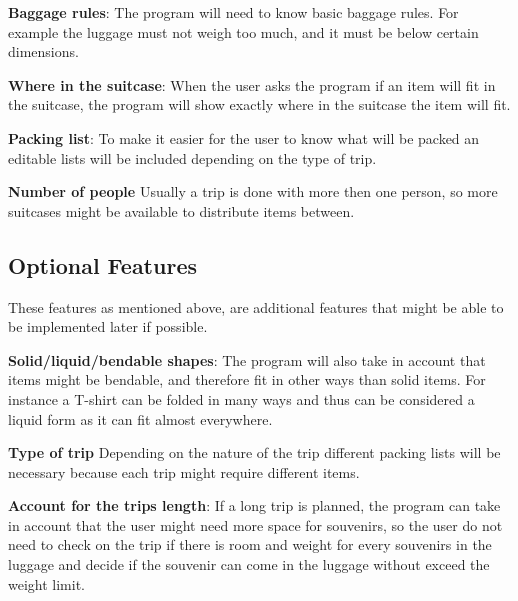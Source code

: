 \textbf{Baggage rules}:
The program will need to know basic baggage rules. For example the luggage must not weigh too much, and it must be below certain dimensions.
\newline

\textbf{Where in the suitcase}:
When the user asks the program if an item will fit in the suitcase, the program will show exactly where in the suitcase the item will fit.
\newline

\textbf{Packing list}:
To make it easier for the user to know what will be packed an editable lists will be included depending on the type of trip.
\newline

\textbf{Number of people}
Usually a trip is done with more then one person, so more suitcases might be available to distribute items between.
\newline

\subsection{Optional Features}
These features as mentioned above, are additional features that might be able to be implemented later if possible.\newline

\textbf{Solid/liquid/bendable shapes}:
The program will also take in account that items might be bendable, and therefore fit in other ways than solid items. For instance a T-shirt can be folded in many ways and thus can be considered a liquid form as it can fit almost everywhere.
\newline

\textbf{Type of trip}
Depending on the nature of the trip different packing lists will be necessary because each trip might require different items.
\newline

\textbf{Account for the trips length}:
If a long trip is planned, the program can take in account that the user might need more space for souvenirs, so the user do not need to check on the trip if there is room and weight for every souvenirs in the luggage and decide if the souvenir can come in the luggage without exceed the weight limit.
\newline